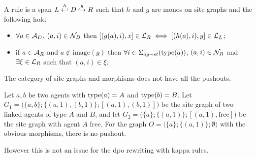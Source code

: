 \begin{definition}
  \label{def:rule_site}
  A rule is a span $L\overset{h}{\hookleftarrow} D \overset{g}{\hookrightarrow} R$ such that $h$ and $g$ are monos on site graphs and the following hold
  \begin{itemize}
  \item $\forall a\in\mathcal{A}_D$, $(a,i)\in\mathcal{N}_D$ then $[(g(a),i),x] \in\mathcal{L}_R \iff [(h(a),i),y] \in\mathcal{L}_L$;
  \item if $a\in\mathcal{A}_R$ and $a\notin\text{image}(g)$ then $\forall i\in\Sigma_{ag-st}(\operatorname{type}(a))$, $(a,i)\in\mathcal{N}_R$ and $\exists \xi\in \mathcal{L}_R$ such that $(a,i)\in \xi$.
  \end{itemize}
\end{definition}

The category of site graphs and morphisms does not have all the pushouts. %

\begin{example}
  Let $a,b$ be two agents with $\operatorname{type}(a)=A$ and $\operatorname{type}(b)=B$.
  Let $G_1 = \big(\{a,b\}; \{(a,1),(b,1)\}; [(a,1),(b,1)]\big)$ be the site graph of two linked agents of type $A$ and $B$, and let $G_2 = \big(\{a\}; \{(a,1)\}; [(a,1),\text{free}] \big)$ be the site graph with agent $A$ free. For the graph $O=\big(\{a\};\{(a,1)\}; \emptyset\big)$ with the obvious morphisms, there is no pushout.
\end{example}

However this is not an issue for the dpo rewriting with kappa rules.


